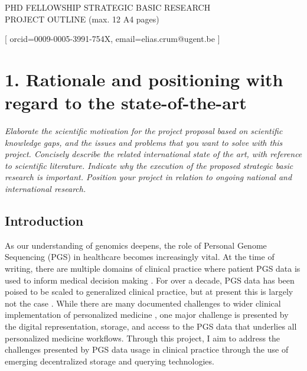 \documentclass[a4paper,11pt]{article}
\begin{document}
\begin{mdframed}[backgroundcolor=black!17,linecolor=black!0,font=\bfseries]
\centering
PHD FELLOWSHIP STRATEGIC BASIC RESEARCH\\
PROJECT OUTLINE (max. 12 A4 pages)\\
\end{mdframed}
\vspace{-.5\baselineskip}

\author{Elias Crum}[
orcid=0009-0005-3991-754X,
email=elias.crum@ugent.be
]

\maketitle

\section{1. Rationale and positioning with regard to the state-of-the-art}
\textit{Elaborate the scientific motivation for the project proposal based on scientific knowledge gaps, and the issues and problems that you want to solve with this project. Concisely describe the related international state of the art, with reference to scientific literature. Indicate why the execution of the proposed strategic basic research is important. Position your project in relation to ongoing national and international research.} 


\subsection{Introduction}
As our understanding of genomics deepens, the role of Personal Genome Sequencing (PGS) in healthcare becomes increasingly vital. 
At the time of writing, there are multiple domains of clinical practice where patient PGS data is used to inform medical decision making \cite{souche_recommendations_2022, gil_analysis_2015}. 
For over a decade, PGS data has been poised to be scaled to generalized clinical practice, but at present this is largely not the case \cite{alzubi_personal_2014}. 
While there are many documented challenges to wider clinical implementation of personalized medicine \cite{stefanicka-wojtas_barriers_2023}, one major challenge is presented by the digital representation, storage, and access to the PGS data that underlies all personalized medicine workflows.
Through this project, I aim to address the challenges presented by PGS data usage in clinical practice through the use of emerging decentralized storage and querying technologies.  
\end{document}
